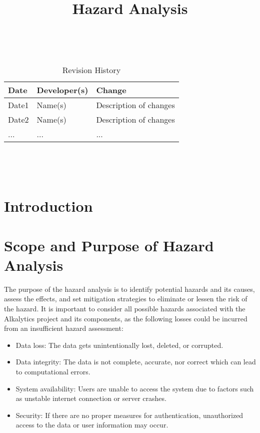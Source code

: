 \documentclass{article}
\title{Hazard Analysis\\\progname}
\author{\authname}
\date{}
\begin{document}
\maketitle
\thispagestyle{empty}

~\newpage


\begin{table}[hp]
\caption{Revision History} \label{TblRevisionHistory}
\begin{tabularx}{\textwidth}{llX}
\toprule
\textbf{Date} & \textbf{Developer(s)} & \textbf{Change}\\
\midrule
Date1 & Name(s) & Description of changes\\
Date2 & Name(s) & Description of changes\\
... & ... & ...\\
\bottomrule
\end{tabularx}
\end{table}

~\newpage

\tableofcontents

~\newpage



\section{Introduction}


\section{Scope and Purpose of Hazard Analysis}

The purpose of the hazard analysis is to identify potential hazards and its
causes, assess the effects, and set mitigation strategies to eliminate or lessen
the risk of the hazard. It is important to consider all possible hazards
associated with the Alkalytics project and its components, as the following
losses could be incurred from an insufficient hazard assessment:
\begin{itemize}
    \item Data loss: The data gets unintentionally lost, deleted, or corrupted.
    \item Data integrity: The data is not complete, accurate, nor correct which
    can lead to computational errors.
    \item System availability: Users are unable to access the system due to
    factors such as unstable internet connection or server crashes.
    \item Security: If there are no proper measures for authentication,
    unauthorized access to the data or user information may occur.
\end{itemize}
\end{document}
